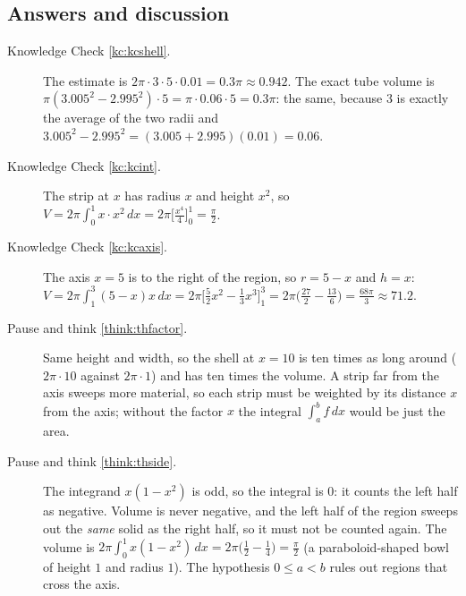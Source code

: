 \documentclass[11pt]{article}
\begin{document}
\subsection*{Answers and discussion}

\begin{description}

  \item[Knowledge Check \ref{kc:kcshell}.] The estimate is $2\pi\cdot3\cdot5\cdot0.01=0.3\pi\approx0.942$. The exact tube volume is $\pi(3.005^2-2.995^2)\cdot5=\pi\cdot0.06\cdot5=0.3\pi$: the same, because $3$ is exactly the average of the two radii and $3.005^2-2.995^2=(3.005+2.995)(0.01)=0.06$.

  \item[Knowledge Check \ref{kc:kcint}.] The strip at $x$ has radius $x$ and height $x^2$, so $V=2\pi\int_0^1x\cdot x^2\,dx=2\pi\bigl[\frac{x^4}4\bigr]_0^1=\frac\pi2$.

  \item[Knowledge Check \ref{kc:kcaxis}.] The axis $x=5$ is to the right of the region, so $r=5-x$ and $h=x$: $V=2\pi\int_1^3(5-x)x\,dx=2\pi\bigl[\frac52x^2-\frac13x^3\bigr]_1^3=2\pi\bigl(\frac{27}2-\frac{13}6\bigr)=\frac{68\pi}3\approx71.2$.

  \item[Pause and think \ref{think:thfactor}.] Same height and width, so the shell at $x=10$ is ten times as long around ($2\pi\cdot10$ against $2\pi\cdot1$) and has ten times the volume. A strip far from the axis sweeps more material, so each strip must be weighted by its distance $x$ from the axis; without the factor $x$ the integral $\int_a^bf\,dx$ would be just the area.

  \item[Pause and think \ref{think:thside}.] The integrand $x(1-x^2)$ is odd, so the integral is $0$: it counts the left half as negative. Volume is never negative, and the left half of the region sweeps out the \emph{same} solid as the right half, so it must not be counted again. The volume is $2\pi\int_0^1x(1-x^2)\,dx=2\pi\bigl(\frac12-\frac14\bigr)=\frac\pi2$ (a paraboloid-shaped bowl of height $1$ and radius $1$). The hypothesis $0\le a<b$ rules out regions that cross the axis.


\end{description}
\end{document}
